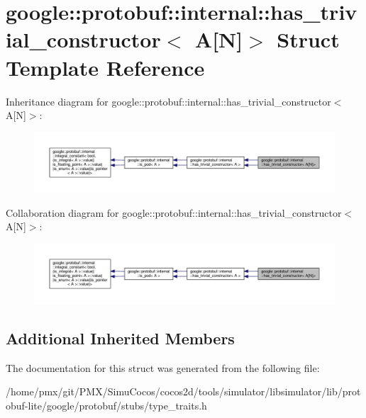 \hypertarget{structgoogle_1_1protobuf_1_1internal_1_1has__trivial__constructor_3_01A[N]_4}{}\section{google\+:\+:protobuf\+:\+:internal\+:\+:has\+\_\+trivial\+\_\+constructor$<$ A\mbox{[}N\mbox{]}$>$ Struct Template Reference}
\label{structgoogle_1_1protobuf_1_1internal_1_1has__trivial__constructor_3_01A[N]_4}


Inheritance diagram for google\+:\+:protobuf\+:\+:internal\+:\+:has\+\_\+trivial\+\_\+constructor$<$ A\mbox{[}N\mbox{]}$>$\+:
\nopagebreak
\begin{figure}[H]
\begin{center}
\leavevmode
\includegraphics[width=350pt]{structgoogle_1_1protobuf_1_1internal_1_1has__trivial__constructor_3_01A[N]_4__inherit__graph}
\end{center}
\end{figure}


Collaboration diagram for google\+:\+:protobuf\+:\+:internal\+:\+:has\+\_\+trivial\+\_\+constructor$<$ A\mbox{[}N\mbox{]}$>$\+:
\nopagebreak
\begin{figure}[H]
\begin{center}
\leavevmode
\includegraphics[width=350pt]{structgoogle_1_1protobuf_1_1internal_1_1has__trivial__constructor_3_01A[N]_4__coll__graph}
\end{center}
\end{figure}
\subsection*{Additional Inherited Members}


The documentation for this struct was generated from the following file\+:\begin{DoxyCompactItemize}
\item 
/home/pmx/git/\+P\+M\+X/\+Simu\+Cocos/cocos2d/tools/simulator/libsimulator/lib/protobuf-\/lite/google/protobuf/stubs/type\+\_\+traits.\+h\end{DoxyCompactItemize}
